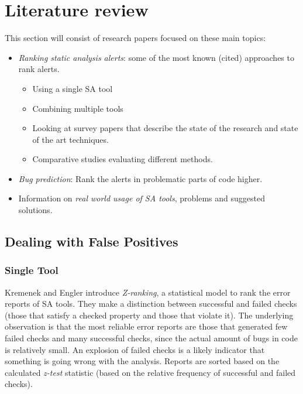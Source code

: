 \section{Literature review}\label{sec:literature}

This section will consist of research papers focused on these main topics: 
\begin{itemize}
    \item \textit{Ranking static analysis alerts}: some of the most known (cited) approaches to rank alerts.
    \begin{itemize}
        \item Using a single SA tool
        \item Combining multiple tools
        \item Looking at survey papers that describe the state of the research and state of the art techniques.
        \item Comparative studies evaluating different methods.
    \end{itemize}
    \item \textit{Bug prediction}: Rank the alerts in problematic parts of code higher.
    \item Information on \textit{real world usage of SA tools}, problems and suggested solutions.
\end{itemize}

 \subsection{Dealing with False Positives}

 \subsubsection{Single Tool}

 Kremenek and Engler \cite{z-ranking} introduce \textit{Z-ranking}, a statistical model to rank the error reports of SA tools. They make a distinction between successful and failed checks (those that satisfy a checked property and those that violate it). The underlying observation is that the most reliable error reports are those that generated few failed checks and many successful checks, since the actual amount of bugs in code is relatively small. An explosion of failed checks is a likely indicator that something is going wrong with the analysis. Reports are sorted based on the calculated \textit{z-test} statistic (based on the relative frequency of successful and failed checks).

